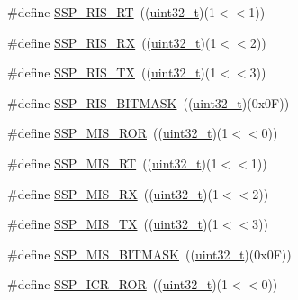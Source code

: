 \begin{DoxyCompactItemize}
\item 
\#define \hyperlink{group___s_s_p___private___macros_gaf3ca75688f2b02dc4df0c1812d246baf}{S\+S\+P\+\_\+\+R\+I\+S\+\_\+\+RT}~((\hyperlink{_p_e___types_8h_a33594304e786b158f3fb30289278f5af}{uint32\+\_\+t})(1$<$$<$1))
\item 
\#define \hyperlink{group___s_s_p___private___macros_gad5b9b44272a78e2dcfa4f11b560a1ac5}{S\+S\+P\+\_\+\+R\+I\+S\+\_\+\+RX}~((\hyperlink{_p_e___types_8h_a33594304e786b158f3fb30289278f5af}{uint32\+\_\+t})(1$<$$<$2))
\item 
\#define \hyperlink{group___s_s_p___private___macros_gaf2019e37460395bc0ee5fe12cd6e2226}{S\+S\+P\+\_\+\+R\+I\+S\+\_\+\+TX}~((\hyperlink{_p_e___types_8h_a33594304e786b158f3fb30289278f5af}{uint32\+\_\+t})(1$<$$<$3))
\item 
\#define \hyperlink{group___s_s_p___private___macros_gaaf0114701def5c9b0e291cdf29fab22d}{S\+S\+P\+\_\+\+R\+I\+S\+\_\+\+B\+I\+T\+M\+A\+SK}~((\hyperlink{_p_e___types_8h_a33594304e786b158f3fb30289278f5af}{uint32\+\_\+t})(0x0\+F))
\item 
\#define \hyperlink{group___s_s_p___private___macros_ga5ab078b780d3ab049afbc4bf1d548164}{S\+S\+P\+\_\+\+M\+I\+S\+\_\+\+R\+OR}~((\hyperlink{_p_e___types_8h_a33594304e786b158f3fb30289278f5af}{uint32\+\_\+t})(1$<$$<$0))
\item 
\#define \hyperlink{group___s_s_p___private___macros_gac656007811dd29f2448a6a534aee04a3}{S\+S\+P\+\_\+\+M\+I\+S\+\_\+\+RT}~((\hyperlink{_p_e___types_8h_a33594304e786b158f3fb30289278f5af}{uint32\+\_\+t})(1$<$$<$1))
\item 
\#define \hyperlink{group___s_s_p___private___macros_gaae1efd94a8b66679f1793a3c5458a777}{S\+S\+P\+\_\+\+M\+I\+S\+\_\+\+RX}~((\hyperlink{_p_e___types_8h_a33594304e786b158f3fb30289278f5af}{uint32\+\_\+t})(1$<$$<$2))
\item 
\#define \hyperlink{group___s_s_p___private___macros_ga1db3ebd72dfe222733297a3fb5ca37af}{S\+S\+P\+\_\+\+M\+I\+S\+\_\+\+TX}~((\hyperlink{_p_e___types_8h_a33594304e786b158f3fb30289278f5af}{uint32\+\_\+t})(1$<$$<$3))
\item 
\#define \hyperlink{group___s_s_p___private___macros_ga9571d63a5315c056b7a54e2f4736c1d7}{S\+S\+P\+\_\+\+M\+I\+S\+\_\+\+B\+I\+T\+M\+A\+SK}~((\hyperlink{_p_e___types_8h_a33594304e786b158f3fb30289278f5af}{uint32\+\_\+t})(0x0\+F))
\item 
\#define \hyperlink{group___s_s_p___private___macros_ga12339c82c252077d3c53bad546a68c75}{S\+S\+P\+\_\+\+I\+C\+R\+\_\+\+R\+OR}~((\hyperlink{_p_e___types_8h_a33594304e786b158f3fb30289278f5af}{uint32\+\_\+t})(1$<$$<$0))

\end{DoxyCompactItemize}
